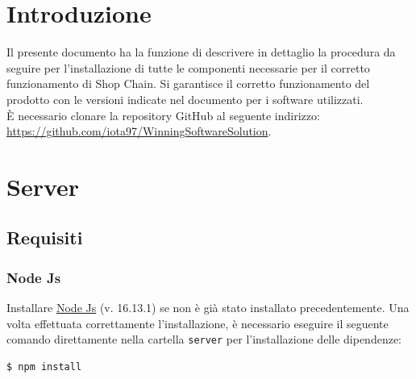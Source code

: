 \documentclass[a4paper, 12pt]{article}
\begin{document}
\makefrontpage

\makeversioni

\tableofcontents
\newpage

\section{Introduzione}
\label{sec:intro}
Il presente documento ha la funzione di descrivere in dettaglio la procedura da seguire per l'installazione di tutte le componenti necessarie per il corretto funzionamento di Shop Chain. Si garantisce il corretto funzionamento del prodotto con le versioni indicate nel documento per i software utilizzati.\\
È necessario clonare la repository GitHub al seguente indirizzo: \url{https://github.com/iota97/WinningSoftwareSolution}.\\

\newpage{}
\section{Server}
\subsection{Requisiti}
\subsubsection{Node Js}
Installare \href{https://nodejs.org/en/download/}{Node Js} (v. 16.13.1) se non è già stato installato precedentemente. Una volta effettuata correttamente l'installazione, è necessario eseguire il seguente comando direttamente nella cartella \texttt{server} per l'installazione delle dipendenze:
\begin{lstlisting}[language=bash]
  $ npm install
\end{lstlisting}
\end{document}
